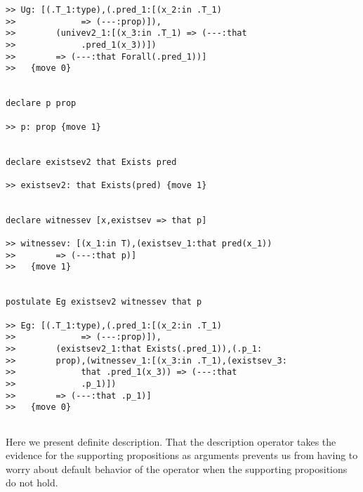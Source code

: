 \documentclass[12pt]{article}
\begin{document}
\begin{verbatim}
>> Ug: [(.T_1:type),(.pred_1:[(x_2:in .T_1) 
>>             => (---:prop)]),
>>        (univev2_1:[(x_3:in .T_1) => (---:that 
>>             .pred_1(x_3))])
>>        => (---:that Forall(.pred_1))]
>>   {move 0}


declare p prop

>> p: prop {move 1}


declare existsev2 that Exists pred

>> existsev2: that Exists(pred) {move 1}


declare witnessev [x,existsev => that p]

>> witnessev: [(x_1:in T),(existsev_1:that pred(x_1)) 
>>        => (---:that p)]
>>   {move 1}


postulate Eg existsev2 witnessev that p

>> Eg: [(.T_1:type),(.pred_1:[(x_2:in .T_1) 
>>             => (---:prop)]),
>>        (existsev2_1:that Exists(.pred_1)),(.p_1:
>>        prop),(witnessev_1:[(x_3:in .T_1),(existsev_3:
>>             that .pred_1(x_3)) => (---:that 
>>             .p_1)])
>>        => (---:that .p_1)]
>>   {move 0}


\end{verbatim}

Here we present definite description.  That the description operator takes the evidence for the supporting propositions as arguments prevents us from having to worry about default behavior of the operator when the supporting propositions do not hold.
\end{document}
